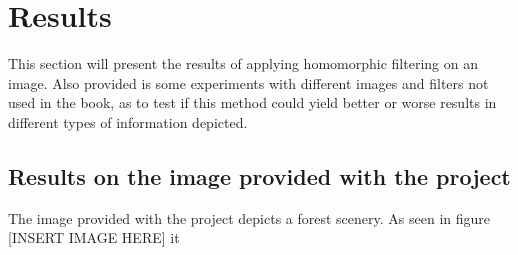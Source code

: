 \documentclass[a4paper]{article}
\begin{document}
\section{Results}
	This section will present the results of applying homomorphic filtering
	on an image. Also provided is some experiments with different images
	and filters not used in the book, as to test if this method could yield
	better or worse results in different types of information depicted.
	\subsection{Results on the image provided with the project}
		The image provided with the project depicts a forest scenery. %
		As seen in figure [INSERT IMAGE HERE] it %
		
\end{document}

